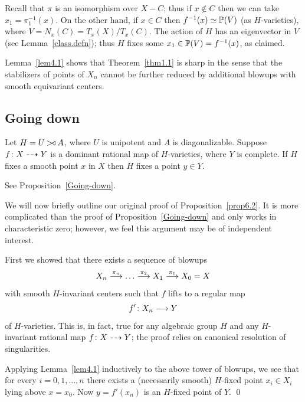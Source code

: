 \begin{pf} Recall that $\pi$ is 
an isomorphism over $X-C$; thus if $x \not \in C$ then we can take
$x_1 = \pi_1^{-1}(x)$. On the other hand, if $x \in C$ then $f^{-1}(x)
\simeq {\Bbb P}(V)$ (as $H$-varieties), where $V = N_x(C) = T_x(X)/T_x(C)$. 
The action of $H$ has an eigenvector in $V$ (see Lemma~\ref{class.defn});
thus $H$ fixes some $x_1 \in{\Bbb P}(V) = f^{-1}(x)$, as claimed.
\end{pf}

\begin{remark} \label{rem.thm1.1-optimal}
Lemma~\ref{lem4.1} shows that Theorem~\ref{thm1.1} is sharp in the sense that
the stabilizers of points of $X_n$ cannot be further reduced by additional 
blowups with smooth equivariant centers. 
\end{remark}

\subsection*{Going down}

\begin{prop} \label{prop6.2} 
Let $H = U \mathbin{{>}\!{\triangleleft}} A$, where $U$ is unipotent and $A$ is diagonalizable.
Suppose $f\colon X \dasharrow Y$ is a dominant rational map of 
$H$-varieties, where $Y$ is complete. 
If $H$ fixes a smooth point $x$ in $X$ then $H$ fixes a point $y \in Y$.
\end{prop}

\begin{pf} See Proposition~\ref{Going-down}.
\end{pf}

\begin{remark} \label{rem6.2}
We will now briefly outline our original proof of Proposition~\ref{prop6.2}.
It is more complicated than the proof of Proposition~\ref{Going-down}
and only works in characteristic zero; however, we feel this argument 
may be of independent interest.

First we showed that there exists a sequence of blowups
\[ X_n \stackrel{\pi_n}{\longrightarrow} \dots \stackrel{\pi_2}{\longrightarrow} X_1 
 \stackrel{\pi_1}{\longrightarrow} X_0 = X \]
with smooth $H$-invariant centers such that $f$ lifts to a regular map 
\[ f'\colon X_n \longrightarrow Y \]
of $H$-varieties. This is, in fact, true for any algebraic group $H$ and any
$H$-invariant rational map $f \colon X \dasharrow Y$; the proof relies on
canonical resolution of singularities.

Applying Lemma~\ref{lem4.1} inductively to the above tower of blowups, 
we see that for every $i = 0, 1, \dots, n$ there exists a (necessarily smooth)
$H$-fixed point $x_i\in X_i$ lying above $x=x_0$. 
Now $y = f'(x_n)$ is an $H$-fixed point of $Y$.
\qed
\end{remark}

